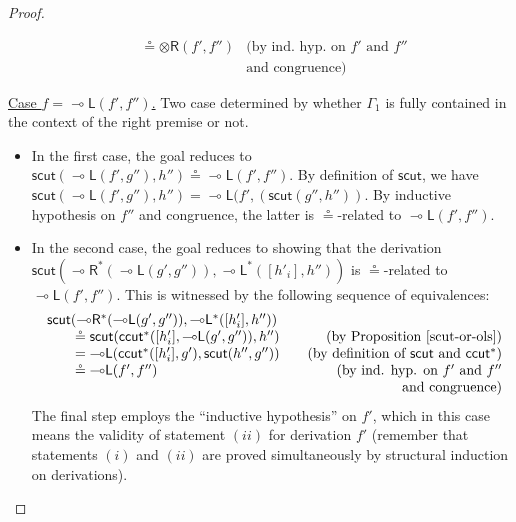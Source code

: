 \documentclass[sn-mathphys-num]{sn-jnl}%
\newcommand{\GG}{\Gamma}
\newcommand{\tr}{\otimes\mathsf{R}}
\newcommand{\lolli}{\multimap}
\newcommand{\lleft}{{\lolli}\mathsf{L}}
\newcommand{\lright}{{\lolli}\mathsf{R}}
\newcommand{\mf}[1]{\mathsf{#1}}
\newcommand{\scut}[2]{\mf{scut} (#1 , #2)}
\theoremstyle{thmstyleone}%
\theoremstyle{thmstyletwo}%
\theoremstyle{thmstylethree}%
\begin{document}
\begin{proof}
\begin{itemize}
\[\begin{array}{lr}
        \qquad \circeq \tr (f',f'')
        & \text{(by ind. hyp. on $f'$ and $f''$}\\
        & \text{and congruence)}
      \end{array}
      \]
  \end{itemize}
  \underline{Case $f = \lleft (f',f'')$.} Two case determined by whether $\GG_1$ is fully contained in the context of the right premise or not.
  \begin{itemize}
    \item In the first case, the goal reduces to $\scut{\lleft(f',g'')}{h''} \circeq \lleft (f' , f'')$. By definition of $\mf{scut}$, we have $\scut{\lleft(f',g'')}{h''} = \lleft(f', (\scut{g''}{h''})$. By inductive hypothesis on $f''$ and congruence, the latter is $\circeq$-related to $\lleft (f' , f'')$.
    \item In the second case, the goal reduces to showing that the derivation $\mf{scut}(\lright^* (\lleft(g',g'')),\lleft^*([h'_i],h''))$ is $\circeq$-related to $\lleft (f',f'')$. This is witnessed by the following sequence of equivalences:
  \[\arraycolsep=10pt    
      \begin{array}{lr}
        \mf{scut}(\lright^* (\lleft(g',g'')),\lleft^*([h'_i],h'')) \\
        \qquad \circeq \mf{scut}(\mf{ccut^*}([h'_i],\lleft(g',g'')),h'')
        & \text{(by Proposition \ref{scut-or-ols})} \\
        \qquad = \lleft(\mf{ccut^*}([h'_i],g'),\mf{scut}(h'',g''))
        & \text{(by definition of $\mf{scut}$ and $\mf{ccut^*}$)} \\
        \qquad \circeq \lleft (f',f'')
        & \text{(by ind. hyp. on $f'$ and $f''$}\\
        & \text{and congruence)}
      \end{array}
      \]
      The final step employs the ``inductive hypothesis'' on $f'$, which in this case means the validity of statement $(ii)$ for derivation $f'$ (remember that statements $(i)$ and $(ii)$ are proved simultaneously by structural induction on derivations).
  \end{itemize}
\end{proof}
\end{document}
